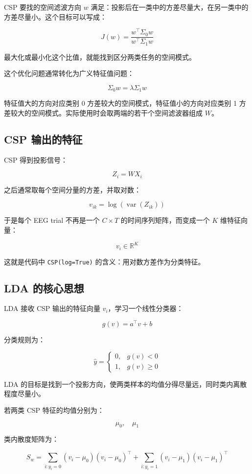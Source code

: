 \documentclass[UTF8,a4paper,12pt]{ctexart}
\begin{document}
CSP 要找的空间滤波方向 \(w\) 满足：投影后在一类中的方差尽量大，在另一类中的方差尽量小。这个目标可以写成：

\[
J(w) = \frac{w^\top \Sigma_0 w}{w^\top \Sigma_1 w}
\]

最大化或最小化这个比值，就能找到区分两类任务的空间模式。

这个优化问题通常转化为广义特征值问题：

\[
\Sigma_0 w = \lambda \Sigma_1 w
\]

特征值大的方向对应类别 0 方差较大的空间模式，特征值小的方向对应类别 1 方差较大的空间模式。实际使用时会取两端的若干个空间滤波器组成 \(W\)。

\subsection{CSP 输出的特征}

CSP 得到投影信号：

\[
Z_i = W X_i
\]

之后通常取每个空间分量的方差，并取对数：

\[
v_{ik} = \log \left( \operatorname{var}(Z_{ik}) \right)
\]

于是每个 EEG trial 不再是一个 \(C \times T\) 的时间序列矩阵，而变成一个 \(K\) 维特征向量：

\[
v_i \in \mathbb{R}^{K}
\]

这就是代码中 \texttt{CSP(log=True)} 的含义：用对数方差作为分类特征。

\subsection{LDA 的核心思想}

LDA 接收 CSP 输出的特征向量 \(v_i\)，学习一个线性分类器：

\[
g(v) = a^\top v + b
\]

分类规则为：

\[
\hat{y} =
\begin{cases}
0, & g(v) < 0 \\
1, & g(v) \geq 0
\end{cases}
\]

LDA 的目标是找到一个投影方向，使两类样本的均值分得尽量远，同时类内离散程度尽量小。

若两类 CSP 特征的均值分别为：

\[
\mu_0, \quad \mu_1
\]

类内散度矩阵为：

\[
S_w = \sum_{i:y_i=0}(v_i-\mu_0)(v_i-\mu_0)^\top
    + \sum_{i:y_i=1}(v_i-\mu_1)(v_i-\mu_1)^\top
\]
\end{document}

